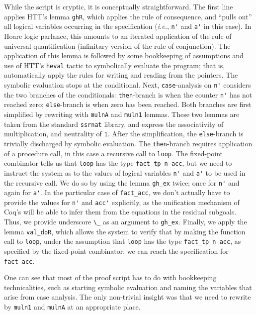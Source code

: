 \documentclass[blockstyle,preprint,nocopyrightspace]{sigplanconf}
\newcommand{\is}[1]{\textcolor{blue}{(Ilya: {#1})}}
\newcommand{\an}[1]{\textcolor{red}{(Aleks: {#1})}}
\newcommand{\code}[1]{\lstinline{#1}}
\newcommand{\ie}{\emph{i.e.}\xspace}
\begin{document}
While the script is cryptic, it is conceptually straightforward.  The
first line applies HTT's lemma \code{ghR}, which applies the rule of
consequence, and ``pulls out'' all logical variables occurring in the
specification (\ie, \code{n'} and \code{a'} in this case). In Hoare
logic parlance, this amounts to an iterated application of the rule of
universal quantification (infinitary version of the rule of
conjunction). The application of this lemma is followed by some
bookkeeping of assumptions and use of HTT's \code{heval} tactic to
symbolically evaluate the program; that is, automatically apply the
rules for writing and reading from the pointers. The symbolic
evaluation stops at the conditional. Next, \code{case}-analysis on
\code{n'} considers the two branches of the conditionals:
\code{then}-branch is when the counter \code{n'} has not reached zero;
\code{else}-branch is when zero has been reached. Both branches are
first simplified by rewriting with \code{mulnA} and \code{muln1}
lemmas. These two lemmas are taken from the standard \code{ssrnat}
library, and express the associativity of multiplication, and
neutrality of \code{1}. After the simplification, the
\code{else}-branch is trivially discharged by symbolic evaluation. The
\code{then}-branch requires application of a procedure call, in this
case a recursive call to \code{loop}.  The fixed-point combinator
tells us that \code{loop} has the type \code{fact_tp n acc}, but we
need to instruct the system as to the values of logical variables
\code{n'} and \code{a'} to be used in the recursive call.  We do so by
using the lemma \code{gh_ex} twice; once for \code{n'} and again for
\code{a'}. In the particular case of \code{fact_acc}, we don't
actually have to provide the values for \code{n'} and \code{acc'}
explicitly, as the unification mechanism of Coq's will be able to
infer them from the equations in the residual subgoals. Thus, we
provide underscore \code{\_} as an argument to \code{gh_ex}. Finally,
we apply the lemma \code{val_doR}, which allows the system to verify
that by making the function call to \code{loop}, under the assumption
that \code{loop} has the type \code{fact_tp n acc}, as specified by
the fixed-point combinator, we can reach the specification for
\code{fact_acc}.

One can see that most of the proof script has to do with bookkeeping
technicalities, such as starting symbolic evaluation and naming the
variables that arise from case analysis. The only non-trivial insight
was that we need to rewrite by \code{muln1} and \code{mulnA} at an
appropriate place.
%
\end{document}
